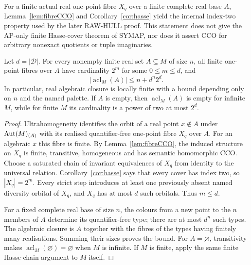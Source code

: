 \begin{remark}
For a finite actual real one-point fibre $X_q$ over a finite complete
real base $A$, Lemma~\ref{lem:fibreCCO} and
Corollary~\ref{cor:hasse} yield the internal index-two property used
by the later RAW-HULL proof. This statement does not give the AP-only
finite Hasse-cover theorem of SYMAP, nor does it assert CCO for arbitrary
nonexact quotients or tuple imaginaries.
\end{remark}

\begin{corollary}
\label{cor:fibre-uniform-acl}
Let $d=|\mathcal D|$. For every nonempty finite real set
$A\subseteq M$ of size $n$, all finite one-point fibres over $A$
have cardinality $2^m$ for some $0\le m\le d$, and
\[
             |\operatorname{acl}_M(A)|\le n+d^n 2^d.
\]
In particular, real algebraic closure is locally finite with a
bound depending only on $n$ and the named palette. If $A$ is empty,
then $\operatorname{acl}_M(A)$ is empty for infinite $M$, while for
finite $M$ its cardinality is a power of two at most $2^d$.
\end{corollary}
\begin{proof}
Ultrahomogeneity identifies the orbit of a real point $x\notin A$
under $\operatorname{Aut}(M)_{(A)}$ with its realised quantifier-free one-point
fibre $X_q$ over $A$. For an algebraic $x$ this fibre is finite.
By Lemma~\ref{lem:fibreCCO}, the induced structure on $X_q$ is
finite, transitive, homogeneous and has semantic homomorphic CCO.
Choose a saturated chain of invariant equivalences of $X_q$ from
identity to the universal relation. Corollary~\ref{cor:hasse} says
that every cover has index two, so $|X_q|=2^m$. Every strict step
introduces at least one previously absent named diversity orbital
of $X_q$, and $X_q$ has at most $d$ such orbitals. Thus $m\le d$.

For a fixed complete real base of size $n$, the colours from a new
point to the $n$ members of $A$ determine its quantifier-free type;
there are at most $d^n$ such types. The algebraic closure is $A$
together with the fibres of the types having finitely many
realisations. Summing their sizes proves the bound. For $A=\varnothing$,
transitivity makes $\operatorname{acl}_M(\varnothing)=\varnothing$
when $M$ is infinite. If $M$ is finite, apply the same finite
Hasse-chain argument to $M$ itself.
\end{proof}

